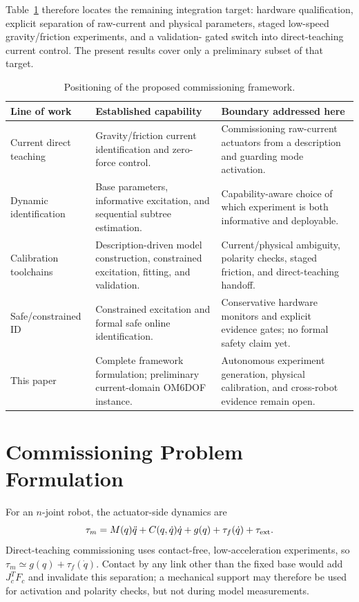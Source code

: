 \documentclass[conference]{IEEEtran}
\begin{document}
Table~\ref{tab:related_work} therefore locates the remaining integration target:
hardware qualification, explicit separation of raw-current and physical
parameters, staged low-speed gravity/friction experiments, and a validation-
gated switch into direct-teaching current control. The present results cover
only a preliminary subset of that target.

\begin{table}[t]
\caption{Positioning of the proposed commissioning framework.}
\label{tab:related_work}
\centering
\footnotesize
\begin{tabular}{p{30mm}p{61mm}p{69mm}}
\toprule
Line of work & Established capability & Boundary addressed here \\
\midrule
Current direct teaching \cite{Chen2018,Chen2023,Li2025ZeroForce} & Gravity/friction current identification and zero-force control. & Commissioning raw-current actuators from a description and guarding mode activation. \\
Dynamic identification \cite{Gautier1991Base,Swevers1997Optimal,Jung2018Backward} & Base parameters, informative excitation, and sequential subtree estimation. & Capability-aware choice of which experiment is both informative and deployable. \\
Calibration toolchains \cite{Nguyen2023FIGAROH,Madsen2022AURT} & Description-driven model construction, constrained excitation, fitting, and validation. & Current/physical ambiguity, polarity checks, staged friction, and direct-teaching handoff. \\
Safe/constrained ID \cite{Tian2024VirtualConstraints,Zhang2025SafeSysID} & Constrained excitation and formal safe online identification. & Conservative hardware monitors and explicit evidence gates; no formal safety claim yet. \\
This paper & Complete framework formulation; preliminary current-domain OM6DOF instance. & Autonomous experiment generation, physical calibration, and cross-robot evidence remain open. \\
\bottomrule
\end{tabular}
\end{table}

\section{Commissioning Problem Formulation}
For an $n$-joint robot, the actuator-side dynamics are
\begin{equation}
 \tau_m=M(q)\ddot q+C(q,\dot q)\dot q+g(q)+\tau_f(\dot q)+\tau_{\rm ext}.
 \label{eq:dynamics}
\end{equation}
Direct-teaching commissioning uses contact-free, low-acceleration experiments,
so $\tau_m\simeq g(q)+\tau_f(\dot q)$. Contact by any link other than the fixed
base would add $J_c^TF_c$ and invalidate this separation; a mechanical support
may therefore be used for activation and polarity checks, but not during model
measurements.
\end{document}
